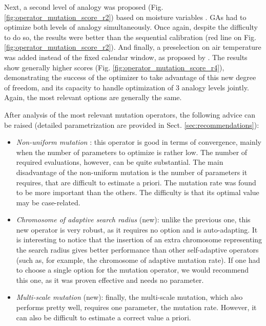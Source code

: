 \documentclass{ametsoc}
\begin{document}
Next, a second level of analogy was proposed (Fig. \ref{fig:operator_mutation_score_r2}) based on moisture variables \citep[see][]{Bontron2004, Horton2016}. GAs had to optimize both levels of analogy simultaneously. Once again, despite the difficulty to do so, the results were better than the sequential calibration (red line on Fig. \ref{fig:operator_mutation_score_r2}). And finally, a preselection on air temperature was added instead of the fixed calendar window, as proposed by \cite{BenDaoud2015}. The results show generally higher scores (Fig. \ref{fig:operator_mutation_score_r4}), demonstrating the success of the optimizer to take advantage of this new degree of freedom, and its capacity to handle optimization of 3 analogy levels jointly. Again, the most relevant options are generally the same.

After analysis of the most relevant mutation operators, the following advice can be raised (detailed parametrization are provided in Sect. \ref{sec:recommendations}):

\begin{itemize}
	
	\item \textit{Non-uniform mutation} \citep{Michalewicz1996}: this operator is good in terms of convergence, mainly when the number of parameters to optimize is rather low. The number of required evaluations, however, can be quite substantial. The main disadvantage of the non-uniform mutation is the number of parameters it requires, that are difficult to estimate a priori. The mutation rate was found to be more important than the others. The difficulty is that its optimal value may be case-related.
	
	\item \textit{Chromosome of adaptive search radius} (new): unlike the previous one, this new operator is very robust, as it requires no option and is auto-adapting. It is interesting to notice that the insertion of an extra chromosome representing the search radius gives better performance than other self-adaptive operators (such as, for example, the chromosome of adaptive mutation rate). If one had to choose a single option for the mutation operator, we would recommend this one, as it was proven effective and needs no parameter.
	
	\item \textit{Multi-scale mutation} (new): finally, the multi-scale mutation, which also performs pretty well, requires one parameter, the mutation rate. However, it can also be difficult to estimate a correct value a priori.
	
\end{itemize}
\end{document}
